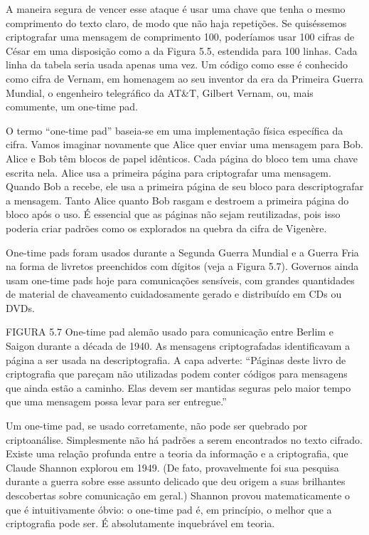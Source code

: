 \documentclass{book}
\begin{document}
A maneira segura de vencer esse ataque é usar uma chave que tenha o mesmo comprimento do texto claro, de modo que não haja repetições. Se quiséssemos criptografar uma mensagem de comprimento 100, poderíamos usar 100 cifras de César em uma disposição como a da Figura 5.5, estendida para 100 linhas. Cada linha da tabela seria usada apenas uma vez. Um código como esse é conhecido como cifra de Vernam, em homenagem ao seu inventor da era da Primeira Guerra Mundial, o engenheiro telegráfico da AT\&T, Gilbert Vernam, ou, mais comumente, um one-time pad.

O termo ``one-time pad'' baseia-se em uma implementação física específica da cifra. Vamos imaginar novamente que Alice quer enviar uma mensagem para Bob. Alice e Bob têm blocos de papel idênticos. Cada página do bloco tem uma chave escrita nela. Alice usa a primeira página para criptografar uma mensagem. Quando Bob a recebe, ele usa a primeira página de seu bloco para descriptografar a mensagem. Tanto Alice quanto Bob rasgam e destroem a primeira página do bloco após o uso. É essencial que as páginas não sejam reutilizadas, pois isso poderia criar padrões como os explorados na quebra da cifra de Vigenère.

One-time pads foram usados durante a Segunda Guerra Mundial e a Guerra Fria na forma de livretos preenchidos com dígitos (veja a Figura 5.7). Governos ainda usam one-time pads hoje para comunicações sensíveis, com grandes quantidades de material de chaveamento cuidadosamente gerado e distribuído em CDs ou DVDs.

FIGURA 5.7 One-time pad alemão usado para comunicação entre Berlim e Saigon durante a década de 1940. As mensagens criptografadas identificavam a página a ser usada na descriptografia. A capa adverte: ``Páginas deste livro de criptografia que pareçam não utilizadas podem conter códigos para mensagens que ainda estão a caminho. Elas devem ser mantidas seguras pelo maior tempo que uma mensagem possa levar para ser entregue.''

Um one-time pad, se usado corretamente, não pode ser quebrado por criptoanálise. Simplesmente não há padrões a serem encontrados no texto cifrado. Existe uma relação profunda entre a teoria da informação e a criptografia, que Claude Shannon explorou em 1949. (De fato, provavelmente foi sua pesquisa durante a guerra sobre esse assunto delicado que deu origem a suas brilhantes descobertas sobre comunicação em geral.) Shannon provou matematicamente o que é intuitivamente óbvio: o one-time pad é, em princípio, o melhor que a criptografia pode ser. É absolutamente inquebrável em teoria.
\end{document}
